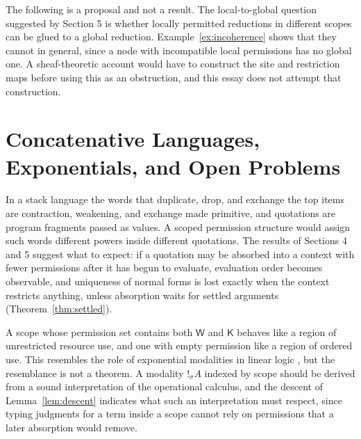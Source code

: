 \documentclass[11pt]{article}
\theoremstyle{definition}
\theoremstyle{remark}
\newcommand{\cK}{\mathsf{K}}
\newcommand{\cW}{\mathsf{W}}
\begin{document}
The following is a proposal and not a result. The local-to-global question suggested by Section 5 is whether locally permitted reductions in different scopes can be glued to a global reduction. Example~\ref{ex:incoherence} shows that they cannot in general, since a node with incompatible local permissions has no global one. A sheaf-theoretic account \citep[Part~C]{johnstone2002} would have to construct the site and restriction maps before using this as an obstruction, and this essay does not attempt that construction.

\section{Concatenative Languages, Exponentials, and Open Problems}

In a stack language the words that duplicate, drop, and exchange the top items are contraction, weakening, and exchange made primitive, and quotations are program fragments passed as values. A scoped permission structure would assign such words different powers inside different quotations. The results of Sections 4 and 5 suggest what to expect: if a quotation may be absorbed into a context with fewer permissions after it has begun to evaluate, evaluation order becomes observable, and uniqueness of normal forms is lost exactly when the context restricts anything, unless absorption waits for settled arguments (Theorem~\ref{thm:settled}).

A scope whose permission set contains both $\cW$ and $\cK$ behaves like a region of unrestricted resource use, and one with empty permission like a region of ordered use. This resembles the role of exponential modalities in linear logic \citep{girard1987}, but the resemblance is not a theorem. A modality $!_\sigma A$ indexed by scope should be derived from a sound interpretation of the operational calculus, and the descent of Lemma~\ref{lem:descent} indicates what such an interpretation must respect, since typing judgments for a term inside a scope cannot rely on permissions that a later absorption would remove.
\end{document}
